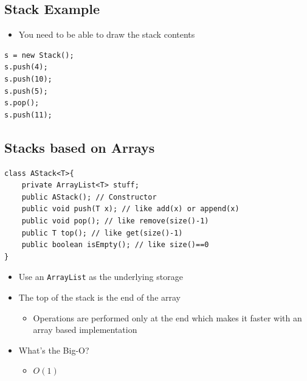\documentclass[10pt]{article}
\begin{document}
\subsection*{Stack Example}
\begin{itemize}
    \item You need to be able to draw the stack contents
\end{itemize}
\begin{verbatim}
s = new Stack();
s.push(4);
s.push(10);
s.push(5);
s.pop();
s.push(11);
\end{verbatim}

\subsection*{Stacks based on Arrays}
\begin{verbatim}
class AStack<T>{
    private ArrayList<T> stuff; 
    public AStack(); // Constructor
    public void push(T x); // like add(x) or append(x)
    public void pop(); // like remove(size()-1)
    public T top(); // like get(size()-1)
    public boolean isEmpty(); // like size()==0
}
\end{verbatim}
\begin{itemize}
    \item Use an \texttt{ArrayList} as the underlying storage
    \item The top of the stack is the end of the array
    \begin{itemize}
        \item Operations are performed only at the end which makes it faster with an array based implementation
    \end{itemize}
    \item What's the Big-O?
    \begin{itemize}
        \item $O(1)$
    \end{itemize}
\end{itemize}
\end{document}
